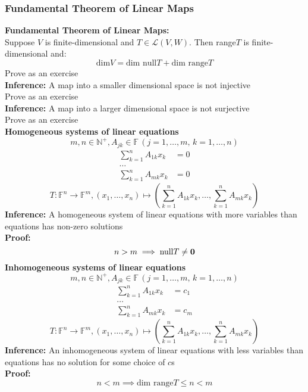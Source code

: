 \documentclass{article}
\newcommand{\N}{\mathbb{N}}
\newcommand{\F}{\mathbb{F}}
\newcommand{\0}{{\bf{0}}}
\begin{document}
\subsubsection{Fundamental Theorem of Linear Maps}
\textbf{Fundamental Theorem of Linear Maps:}\\
Suppose $V$ is finite-dimensional and $T\in\mathcal{L}(V,W)$. Then range$T$ is finite-dimensional and:
$$\mbox{dim}V=\mbox{dim null}T+\mbox{dim range}T$$
\null\hfill{Prove as an exercise}\\
\textbf{Inference:} A map into a smaller dimensional space is not injective\\
\null\hfill{Prove as an exercise}\\
\textbf{Inference:} A map into a larger dimensional space is not surjective\\
\null\hfill{Prove as an exercise}\\
\textbf{Homogeneous systems of linear equations}
$$m,n\in\N^+,A_{jk}\in\F\,(j=1,\dots,m,\,k=1,\dots,n)$$
\begin{equation}
\begin{split}
    \sum_{k=1}^nA_{1k}x_k&=0\\
    \dots&\\
    \sum_{k=1}^nA_{mk}x_k&=0
\end{split}
\end{equation}
$$T:\F^n\to\F^m,(x_1,\dots,x_n)\mapsto\left(\sum_{k=1}^nA_{1k}x_k,\dots,\sum_{k=1}^nA_{mk}x_k\right)$$
\textbf{Inference:} A homogeneous system of linear equations with more variables than equations has non-zero solutions\\
\textbf{Proof:}
$$n>m\implies\mbox{null}T\neq\0$$
\textbf{Inhomogeneous systems of linear equations}
$$m,n\in\N^+,A_{jk}\in\F\,(j=1,\dots,m,\,k=1,\dots,n)$$
\begin{equation}
\begin{split}
    \sum_{k=1}^nA_{1k}x_k&=c_1\\
    \dots&\\
    \sum_{k=1}^nA_{mk}x_k&=c_m
\end{split}
\end{equation}
$$T:\F^n\to\F^m,(x_1,\dots,x_n)\mapsto\left(\sum_{k=1}^nA_{1k}x_k,\dots,\sum_{k=1}^nA_{mk}x_k\right)$$
\textbf{Inference:} An inhomogeneous system of linear equations with less variables than equations has no solution for some choice of $c$s\\
\textbf{Proof:}
$$n<m\implies\mbox{dim range}T\le n<m$$
\end{document}
